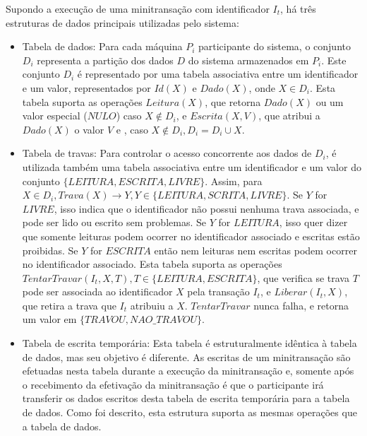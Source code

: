 \documentclass[11pt,twoside,a4paper]{book}
\begin{document}
Supondo a execução de uma minitransação com identificador \(I_t\), há três estruturas de dados principais utilizadas pelo sistema:
\begin{itemize}
\item Tabela de dados: Para cada máquina \(P_i\) participante do sistema, o conjunto \(D_i\) representa a partição dos dados \(D\) do sistema armazenados em \(P_i\). Este conjunto \(D_i\) é representado por uma tabela associativa entre um identificador e um valor, representados por \(Id(X)\) e \(Dado(X)\), onde \(X \in D_i\). Esta tabela suporta as operações \(Leitura(X)\), que retorna \(Dado(X)\) ou um valor especial (\(NULO\)) caso \(X \notin D_i\), e \(Escrita(X, V)\), que atribui a \(Dado(X)\) o valor \(V\) e , caso \(X \notin D_i, D_i = D_i \cup X\). 
\item Tabela de travas: Para controlar o acesso concorrente aos dados de \(D_i\), é utilizada também uma tabela associativa entre um identificador e um valor do conjunto \(\{LEITURA, ESCRITA, LIVRE\}\). Assim, para \(X \in D_i, Trava(X) \rightarrow Y, Y \in \{LEITURA, SCRITA, LIVRE\}\). Se \(Y\) for \(LIVRE\), isso indica que o identificador não possui nenhuma trava associada, e pode ser lido ou escrito sem problemas. Se \(Y\) for \(LEITURA\), isso quer dizer que somente leituras podem ocorrer no identificador associado e escritas estão proibidas. Se \(Y\) for \(ESCRITA\) então nem leituras nem escritas podem ocorrer no identificador associado. Esta tabela suporta as operações \(TentarTravar(I_t, X, T), T \in \{LEITURA, ESCRITA\}\), que verifica se trava \(T\) pode ser associada ao identificador \(X\) pela transação \(I_t\), e \(Liberar(I_t, X)\), que retira a trava que \(I_t\) atribuiu a \(X\). \(TentarTravar\) nunca falha, e retorna um valor em \(\{TRAVOU, NAO\_TRAVOU\}\).
\item Tabela de escrita temporária: Esta tabela é estruturalmente idêntica à tabela de dados, mas seu objetivo é diferente. As escritas de um minitransação são efetuadas nesta tabela durante a execução da minitransação e, somente após o recebimento da efetivação da minitransação é que o participante irá transferir os dados escritos desta tabela de escrita temporária para a tabela de dados. Como foi descrito, esta estrutura suporta as mesmas operações que a tabela de dados.
\end{itemize}
\end{document}

